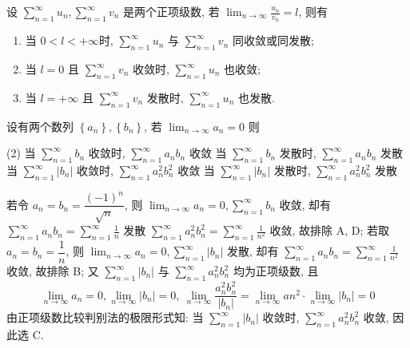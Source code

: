 \begin{theorem}[比较审敛法的极限形式]
    设 $\displaystyle  \sum_{n=1}^{\infty} u_{n}, \sum_{n=1}^{\infty} v_{n} $ 是两个正项级数, 若 $\displaystyle  \lim _{n \rightarrow \infty} \frac{u_{n}}{v_{n}}=l $, 则有
    \begin{enumerate}[label=(\arabic{*})]
        \item 当 $ 0<l<+\infty  $时, $\displaystyle \sum_{n=1}^{\infty} u_{n} $ 与 $\displaystyle  \sum_{n=1}^{\infty} v_{n} $ 同收敛或同发散;
        \item 当 $ l=0 $ 且 $\displaystyle  \sum_{n=1}^{\infty} v_{n} $ 收敛时, $\displaystyle  \sum_{n=1}^{\infty} u_{n} $ 也收敛;
        \item 当 $ l=+\infty $ 且 $\displaystyle  \sum_{n=1}^{\infty} v_{n} $ 发散时, $\displaystyle \sum_{n=1}^{\infty} u_{n} $ 也发散.
    \end{enumerate}
\end{theorem}

\begin{example}[2009 数一]
    设有两个数列 $ \left\{a_{n}\right\},\left\{b_{n}\right\}$, 若 $\displaystyle \lim _{n \to \infty} a_{n}=0 $ 则
    \begin{tasks}(2)
        \task 当 $\displaystyle \sum_{n=1}^{\infty} b_{n} $ 收敛时, $\displaystyle \sum_{n=1}^{\infty} a_{n} b_{n} $ 收敛
        \task 当 $\displaystyle \sum_{n=1}^{\infty} b_{n} $ 发散时, $\displaystyle \sum_{n=1}^{\infty} a_{n} b_{n} $ 发散
        \task 当 $\displaystyle \sum_{n=1}^{\infty}\left|b_{n}\right| $ 收敛时, $\displaystyle \sum_{n=1}^{\infty} a_{n}^{2} b_{n}^{2} $ 收敛
        \task 当 $\displaystyle \sum_{n=1}^{\infty}\left|b_{n}\right| $ 发散时, $\displaystyle \sum_{n=1}^{\infty} a_{n}^{2} b_{n}^{2} $ 发散
    \end{tasks}
\end{example}
\begin{solution}
    若令 $ a_{n}=b_{n}=\dfrac{(-1)^{n}}{\sqrt{n}}$, 则 $\displaystyle \lim _{n \rightarrow \infty} a_{n}=0, \sum_{n=1}^{\infty} b_{n} $ 收敛, 
    却有 $\displaystyle  \sum_{n=1}^{\infty} a_{n} b_{n}=\sum_{n=1}^{\infty} \frac{1}{n} $ 发散 $\displaystyle \sum_{n=1}^{\infty} a_{n}^{2} b_{n}^{2}=\sum_{n=1}^{\infty} \frac{1}{n^{2}} $ 收敛, 
    故排除 A, D;
    若取 $ a_{n}=b_{n}=\dfrac{1}{n} $, 则 $\displaystyle  \lim _{n \rightarrow \infty} a_{n}=0, \sum_{n=1}^{\infty}\left|b_{n}\right| $ 发散, 
    却有 $\displaystyle \sum_{n=1}^{\infty} a_{n} b_{n}=\sum_{n=1}^{\infty} \frac{1}{n^{2}} $ 收敛, 故排除 B;
    又 $\displaystyle \sum_{n=1}^{\infty}\left|b_{n}\right| $ 与 $\displaystyle \sum_{n=1}^{\infty} a_{n}^{2} b_{n}^{2} $ 均为正项级数, 且
    $$\displaystyle\lim _{n \rightarrow \infty} a_{n}=0, \lim _{n \rightarrow \infty}\left|b_{n}\right|=0 ,~\lim_{n\to\infty}\dfrac{a_n^2b_n^2}{|b_n|}=\lim_{n\to\infty}an^2\cdot\lim_{n\to\infty}|b_n|=0$$
    由正项级数比较判别法的极限形式知: 当 $\displaystyle\sum_{n=1}^{\infty}|b_n|$ 收敛时, $\displaystyle\sum_{n=1}^{\infty}a_n^2b_n^2$ 收敛, 因此选 C.
\end{solution}

